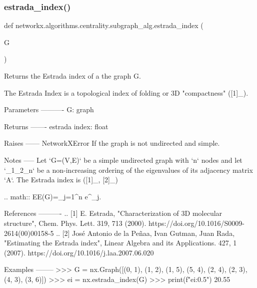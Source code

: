  \mbox{\label{namespacenetworkx_1_1algorithms_1_1centrality_1_1subgraph__alg_a073579bc3ceae86ac3214562d6a4ee6c}} 
\subsubsection{\texorpdfstring{estrada\+\_\+index()}{estrada\_index()}}
{\footnotesize\ttfamily def networkx.\+algorithms.\+centrality.\+subgraph\+\_\+alg.\+estrada\+\_\+index (\begin{DoxyParamCaption}\item[{}]{G }\end{DoxyParamCaption})}

\begin{DoxyVerb}Returns the Estrada index of a the graph G.

The Estrada Index is a topological index of folding or 3D "compactness" ([1]_).

Parameters
----------
G: graph

Returns
-------
estrada index: float

Raises
------
NetworkXError
    If the graph is not undirected and simple.

Notes
-----
Let `G=(V,E)` be a simple undirected graph with `n` nodes  and let
`\lambda_{1}\leq\lambda_{2}\leq\cdots\lambda_{n}`
be a non-increasing ordering of the eigenvalues of its adjacency
matrix `A`. The Estrada index is ([1]_, [2]_)

.. math::
    EE(G)=\sum_{j=1}^n e^{\lambda _j}.

References
----------
.. [1] E. Estrada, "Characterization of 3D molecular structure",
   Chem. Phys. Lett. 319, 713 (2000).
   https://doi.org/10.1016/S0009-2614(00)00158-5
.. [2] José Antonio de la Peñaa, Ivan Gutman, Juan Rada,
   "Estimating the Estrada index",
   Linear Algebra and its Applications. 427, 1 (2007).
   https://doi.org/10.1016/j.laa.2007.06.020

Examples
--------
>>> G = nx.Graph([(0, 1), (1, 2), (1, 5), (5, 4), (2, 4), (2, 3), (4, 3), (3, 6)])
>>> ei = nx.estrada_index(G)
>>> print(f"{ei:0.5}")
20.55
\end{DoxyVerb}
 \mbox{\label{namespacenetworkx_1_1algorithms_1_1centrality_1_1subgraph__alg_a25d1ab7bae1c2fd1078b1f424cc3c8f0}} 

